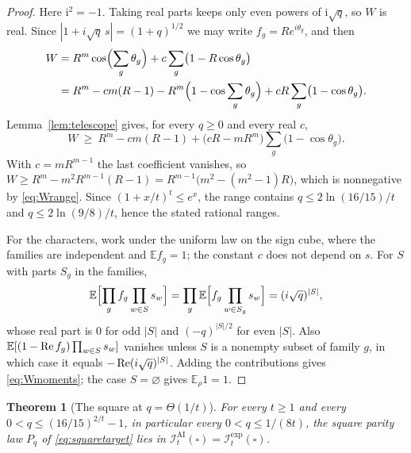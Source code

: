 \documentclass[11pt]{article}
\theoremstyle{plain}
\newtheorem{theorem}{Theorem}[section]
\theoremstyle{definition}
\newcommand{\IAI}{\mathcal I^{\mathrm{AI}}}
\newcommand{\Iexp}{\mathcal I^{\mathrm{exp}}}
\newcommand{\E}{\mathbb E}
\begin{document}
\begin{proof}
Here $\mathrm{i}^2=-1$. Taking real parts keeps only even powers of $\mathrm{i}\sqrt q$, so $W$ is real. Since $|1+i\sqrt q\,s|=(1+q)^{1/2}$ we may write $f_g=Re^{i\theta_g}$, and then
\[
\begin{aligned}
W&=R^m\cos\Bigl(\sum_g\theta_g\Bigr)+c\sum_g\bigl(1-R\cos\theta_g\bigr)\\
&=R^m-cm(R-1)-R^m\Bigl(1-\cos\sum_g\theta_g\Bigr)+cR\sum_g\bigl(1-\cos\theta_g\bigr).
\end{aligned}
\]
Lemma~\ref{lem:telescope} gives, for every $q\ge0$ and every real $c$,
\[
W\ \ge\ R^m-cm(R-1)+\bigl(cR-mR^m\bigr)\sum_g\bigl(1-\cos\theta_g\bigr).
\]
With $c=mR^{m-1}$ the last coefficient vanishes, so $W\ge R^m-m^2R^{m-1}(R-1)=R^{m-1}\bigl(m^2-(m^2-1)R\bigr)$, which is nonnegative by \eqref{eq:Wrange}. Since $(1+x/t)^t\le e^x$, the range contains $q\le2\ln(16/15)/t$ and $q\le2\ln(9/8)/t$, hence the stated rational ranges.

For the characters, work under the uniform law on the sign cube, where the families are independent and $\E f_g=1$; the constant $c$ does not depend on $s$. For $S$ with parts $S_g$ in the families,
\[
\E\Bigl[\prod_gf_g\prod_{w\in S}s_w\Bigr]=\prod_g\E\Bigl[f_g\prod_{w\in S_g}s_w\Bigr]=(i\sqrt q)^{|S|},
\]
whose real part is $0$ for odd $|S|$ and $(-q)^{|S|/2}$ for even $|S|$. Also $\E[(1-\Real f_g)\prod_{w\in S}s_w]$ vanishes unless $S$ is a nonempty subset of family $g$, in which case it equals $-\operatorname{Re}(i\sqrt q)^{|S|}$. Adding the contributions gives \eqref{eq:Wmoments}; the case $S=\varnothing$ gives $\E_\rho1=1$.
\end{proof}

\begin{theorem}[The square at $q=\Theta(1/t)$]\label{thm:squarelinear}
For every $t\ge1$ and every $0<q\le(16/15)^{2/t}-1$, in particular every $0<q\le1/(8t)$, the square parity law $P_q$ of \eqref{eq:squaretarget} lies in $\IAI_t(\square)=\Iexp_t(\square)$.
\end{theorem}
\end{document}
